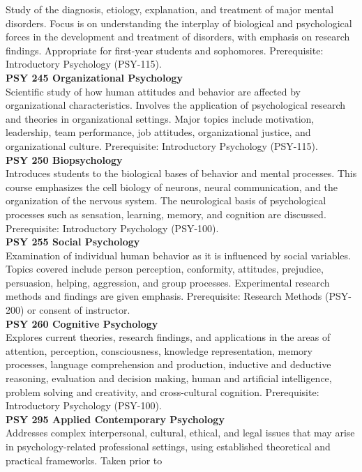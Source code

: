 \documentclass[
  letterpaper,
]{scrbook}
\begin{document}
Study of the diagnosis, etiology, explanation, and treatment of major
mental disorders. Focus is on understanding the interplay of biological
and psychological forces in the development and treatment of disorders,
with emphasis on research findings. Appropriate for first-year students
and sophomores. Prerequisite: Introductory Psychology (PSY-115).\\
\textbf{PSY 245 Organizational Psychology}\\
Scientific study of how human attitudes and behavior are affected by
organizational characteristics. Involves the application of
psychological research and theories in organizational settings. Major
topics include motivation, leadership, team performance, job attitudes,
organizational justice, and organizational culture. Prerequisite:
Introductory Psychology (PSY-115).\\
\textbf{PSY 250 Biopsychology}\\
Introduces students to the biological bases of behavior and mental
processes. This course emphasizes the cell biology of neurons, neural
communication, and the organization of the nervous system. The
neurological basis of psychological processes such as sensation,
learning, memory, and cognition are discussed. Prerequisite:
Introductory Psychology (PSY-100).\\
\textbf{PSY 255 Social Psychology}\\
Examination of individual human behavior as it is influenced by social
variables. Topics covered include person perception, conformity,
attitudes, prejudice, persuasion, helping, aggression, and group
processes. Experimental research methods and findings are given
emphasis. Prerequisite: Research Methods (PSY-200) or consent of
instructor.\\
\textbf{PSY 260 Cognitive Psychology}\\
Explores current theories, research findings, and applications in the
areas of attention, perception, consciousness, knowledge representation,
memory processes, language comprehension and production, inductive and
deductive reasoning, evaluation and decision making, human and
artificial intelligence, problem solving and creativity, and
cross-cultural cognition. Prerequisite: Introductory Psychology
(PSY-100).\\
\textbf{PSY 295 Applied Contemporary Psychology}\\
Addresses complex interpersonal, cultural, ethical, and legal issues
that may arise in psychology-related professional settings, using
established theoretical and practical frameworks. Taken prior to
\end{document}
